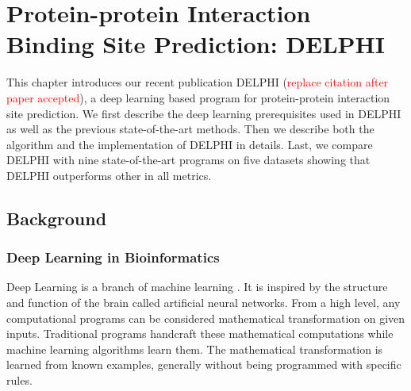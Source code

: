\chapter{Protein-protein Interaction Binding Site Prediction: DELPHI}
This chapter introduces our recent publication DELPHI \cite{li2020delphi} (\textcolor{red}{replace citation after paper accepted}), a deep learning based program for protein-protein interaction site prediction. We first describe the deep learning prerequisites used in DELPHI as well as the previous state-of-the-art methods. Then we describe both the algorithm and the implementation of DELPHI in details. Last, we compare DELPHI with nine state-of-the-art programs on five datasets showing that DELPHI outperforms other in all metrics. 
\section{Background}
\subsection{Deep Learning in Bioinformatics}
Deep Learning is a branch of machine learning \cite{goodfellow2016deep}. It is inspired by the structure and function of the brain called artificial neural networks. From a high level, any computational programs can be considered mathematical transformation on given inputs. Traditional programs handcraft these mathematical computations while machine learning algorithms learn them. The mathematical transformation is learned from known examples, generally without being programmed with specific rules.

